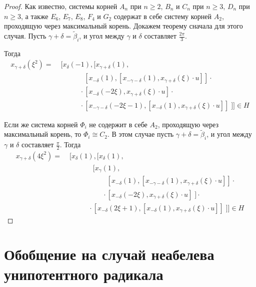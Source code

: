 \documentclass[12pt]{matmex-diploma}
\theoremstyle{mystyleni}
\theoremstyle{mystyle}
\renewcommand{\ge}{\geqslant}
\begin{document}
\begin{proof}
Как известно, системы корней $A_n$ при $n\ge 2$, $B_n$ и $C_n$ при $n\ge 3$, $D_n$ при $n\ge 3$, а также $E_6$, $E_7$, $E_8$, $F_4$ и $G_2$ содержат в себе систему корней $A_2$, проходящую через максимальный корень. Докажем теорему сначала для этого случая. Пусть $\gamma+\delta=\widetilde\beta_i$, и угол между $\gamma$ и $\delta$ составляет $\frac{2\pi}{3}$.

Тогда
\begin{equation*}
\begin{split}
x_{\gamma+\delta}(\xi^2) = & \; [x_\delta(-1),[x_{\gamma+\delta}(1), \\
& \quad\qquad \phantom{{}\cdot{}} [x_{-\delta}(1),[x_{-\gamma-\delta}(1),x_{\gamma+\delta}(\xi) \cdot u]] \cdot {} \\
& \quad\qquad \cdot [x_{-\delta}(-2\xi),x_{\gamma+\delta}(\xi) \cdot u] \cdot {} \\
& \quad\qquad \cdot [x_{-\gamma-\delta}(-2\xi-1),[x_{-\delta}(1),x_{\gamma+\delta}(\xi) \cdot u]] \; ]] \in H
\end{split}
\end{equation*}

Если же система корней $\Phi_i$ не содержит в себе $A_2$, проходящую через максимальный корень, то $\Phi_i \cong C_2$. В этом случае пусть $\gamma+\delta=\widetilde\beta_i$, и угол между $\gamma$ и $\delta$ составляет $\frac{\pi}{2}$.
Тогда
\begin{equation*}
\begin{split}
x_{\gamma+\delta}(4\xi^2) = & \; [x_\delta(1),[x_\delta(1), \\
& \quad\qquad \phantom{{}\cdot{}} [x_\gamma(1),\\
& \quad\qquad\qquad \phantom{{}\cdot{}} [x_{-\delta}(1),[x_{-\gamma-\delta}(1),x_{\gamma+\delta}(\xi ) \cdot u]] \cdot{} \\
& \quad\qquad\qquad {}\cdot [x_{-\delta}(-2 \xi ),x_{\gamma+\delta}(\xi ) \cdot u] \; ] \cdot{} \\
& \quad\qquad {}\cdot [x_{-\delta}(2 \xi +1),[x_{-\delta}(1),x_{\gamma+\delta}(\xi ) \cdot u]] \; ]] \in H
\end{split}
\end{equation*}
\end{proof}

\newpage
\section{Обобщение на случай неабелева унипотентного радикала}
\end{document}
